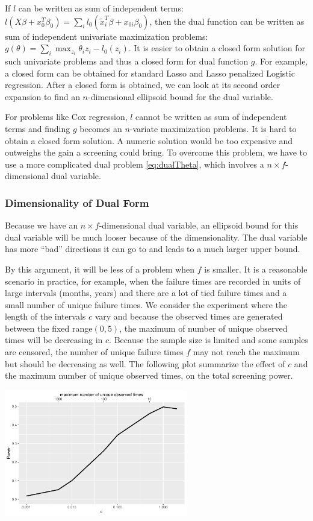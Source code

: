 If $l$ can be written as sum of independent terms: $l(X\beta+x_0^T\beta_0)=\sum_i l_0(\tilde{x}_i^T\beta+x_{0i}\beta_0)$, then the dual function can be written as sum of independent univariate maximization problems: $g(\theta)=\sum_i\max_{z_i} \theta_iz_i-l_0(z_i)$. It is easier to obtain a closed form solution for such univariate problems and thus a closed form for dual function $g$. For example, a closed form can be obtained for standard Lasso and Lasso penalized Logistic regression. After a closed form is obtained, we can look at its second order expansion to find an $n$-dimensional ellipsoid bound for the dual variable.

For problems like Cox regression, $l$ cannot be written as sum of independent terms and finding $g$ becomes an $n$-variate maximization problems. It is hard to obtain a closed form solution. A numeric solution would be too expensive and outweighs the gain a screening could bring. To overcome this problem, we have to use a more complicated dual problem \eqref{eq:dualTheta}, which involves a $n\times f$-dimensional dual variable. 

\subsubsection{Dimensionality of Dual Form}

Because we have an $n\times f$-dimensional dual variable, an ellipsoid bound for this dual variable will be much looser because of the dimensionality. The dual variable has more ``bad'' directions it can go to and leads to a much larger upper bound.

By this argument, it will be less of a problem when $f$ is smaller. It is a reasonable scenario in practice, for example, when the failure times are recorded in units of large intervals (months, years) and there are a lot of tied failure times and a small number of unique failure times. We consider the experiment where the length of the intervals $c$ vary and because the observed times are generated between the fixed range$(0,5)$, the maximum of number of unique observed times will be decreasing in $c$. Because the sample size is limited and some samples are censored, the number of unique failure times $f$ may not reach the maximum but should be decreasing as well. The following plot summarize the effect of $c$ and the maximum number of unique observed times, on the total screening power.

\begin{center}
    \includegraphics[width=0.6\textwidth]{interval.pdf}
\end{center}

